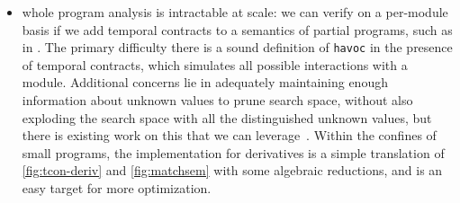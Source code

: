 \begin{itemize}
{{}
}
%
\item{whole program analysis is intractable at scale:
%
we can verify on a per-module basis if we add temporal contracts to a semantics of partial programs, such as in \citet{dvanhorn:TobinHochstadt2012Higherorder}.
%
The primary difficulty there is a sound definition of {\tt havoc} in the presence of temporal contracts, which simulates all possible interactions with a module.
%
Additional concerns lie in adequately maintaining enough information about unknown values to prune search space, without also exploding the search space with all the distinguished unknown values, but there is existing work on this that we can leverage~\citep{ianjohnson:DBLP:journals/cacm/DilligDA10}.
%
Within the confines of small programs, the implementation for derivatives is a simple translation of \autoref{fig:tcon-deriv} and \autoref{fig:matchsem} with some algebraic reductions, and is an easy target for more optimization.
}
\end{itemize}
%
%

